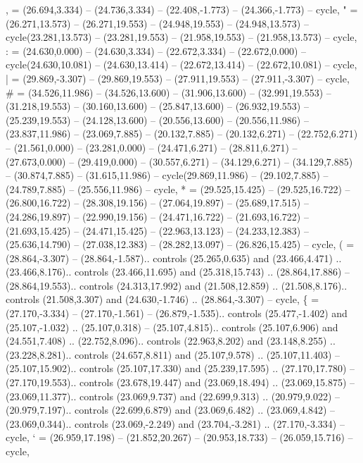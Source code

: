 {,} = {(26.694,3.334) -- (24.736,3.334) -- (22.408,-1.773) -- (24.366,-1.773) -- cycle},
{"} = {(26.271,13.573) -- (26.271,19.553) -- (24.948,19.553) -- (24.948,13.573) -- cycle(23.281,13.573) -- (23.281,19.553) -- (21.958,19.553) -- (21.958,13.573) -- cycle},
{:} = {(24.630,0.000) -- (24.630,3.334) -- (22.672,3.334) -- (22.672,0.000) -- cycle(24.630,10.081) -- (24.630,13.414) -- (22.672,13.414) -- (22.672,10.081) -- cycle},
{|} = {(29.869,-3.307) -- (29.869,19.553) -- (27.911,19.553) -- (27.911,-3.307) -- cycle},
{\#} = {(34.526,11.986) -- (34.526,13.600) -- (31.906,13.600) -- (32.991,19.553) -- (31.218,19.553) -- (30.160,13.600) -- (25.847,13.600) -- (26.932,19.553) -- (25.239,19.553) -- (24.128,13.600) -- (20.556,13.600) -- (20.556,11.986) -- (23.837,11.986) -- (23.069,7.885) -- (20.132,7.885) -- (20.132,6.271) -- (22.752,6.271) -- (21.561,0.000) -- (23.281,0.000) -- (24.471,6.271) -- (28.811,6.271) -- (27.673,0.000) -- (29.419,0.000) -- (30.557,6.271) -- (34.129,6.271) -- (34.129,7.885) -- (30.874,7.885) -- (31.615,11.986) -- cycle(29.869,11.986) -- (29.102,7.885) -- (24.789,7.885) -- (25.556,11.986) -- cycle},
{*} = {(29.525,15.425) -- (29.525,16.722) -- (26.800,16.722) -- (28.308,19.156) -- (27.064,19.897) -- (25.689,17.515) -- (24.286,19.897) -- (22.990,19.156) -- (24.471,16.722) -- (21.693,16.722) -- (21.693,15.425) -- (24.471,15.425) -- (22.963,13.123) -- (24.233,12.383) -- (25.636,14.790) -- (27.038,12.383) -- (28.282,13.097) -- (26.826,15.425) -- cycle},
{(} = {(28.864,-3.307) -- (28.864,-1.587).. controls (25.265,0.635) and (23.466,4.471) .. (23.466,8.176).. controls (23.466,11.695) and (25.318,15.743) .. (28.864,17.886) -- (28.864,19.553).. controls (24.313,17.992) and (21.508,12.859) .. (21.508,8.176).. controls (21.508,3.307) and (24.630,-1.746) .. (28.864,-3.307) -- cycle},
{\{} = {(27.170,-3.334) -- (27.170,-1.561) -- (26.879,-1.535).. controls (25.477,-1.402) and (25.107,-1.032) .. (25.107,0.318) -- (25.107,4.815).. controls (25.107,6.906) and (24.551,7.408) .. (22.752,8.096).. controls (22.963,8.202) and (23.148,8.255) .. (23.228,8.281).. controls (24.657,8.811) and (25.107,9.578) .. (25.107,11.403) -- (25.107,15.902).. controls (25.107,17.330) and (25.239,17.595) .. (27.170,17.780) -- (27.170,19.553).. controls (23.678,19.447) and (23.069,18.494) .. (23.069,15.875) -- (23.069,11.377).. controls (23.069,9.737) and (22.699,9.313) .. (20.979,9.022) -- (20.979,7.197).. controls (22.699,6.879) and (23.069,6.482) .. (23.069,4.842) -- (23.069,0.344).. controls (23.069,-2.249) and (23.704,-3.281) .. (27.170,-3.334) -- cycle},
{`} = {(26.959,17.198) -- (21.852,20.267) -- (20.953,18.733) -- (26.059,15.716) -- cycle},
